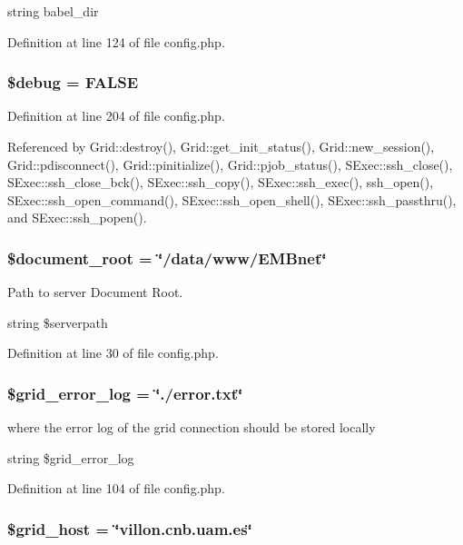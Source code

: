string babel\_\-dir 

Definition at line 124 of file config.php.
\subsubsection{\setlength{\rightskip}{0pt plus 5cm}\$debug = FALSE}\label{config_8php_a21}




Definition at line 204 of file config.php.

Referenced by Grid::destroy(), Grid::get\_\-init\_\-status(), Grid::new\_\-session(), Grid::pdisconnect(), Grid::pinitialize(), Grid::pjob\_\-status(), SExec::ssh\_\-close(), SExec::ssh\_\-close\_\-bck(), SExec::ssh\_\-copy(), SExec::ssh\_\-exec(), ssh\_\-open(), SExec::ssh\_\-open\_\-command(), SExec::ssh\_\-open\_\-shell(), SExec::ssh\_\-passthru(), and SExec::ssh\_\-popen().
\subsubsection{\setlength{\rightskip}{0pt plus 5cm}\$document\_\-root = \char`\"{}/data/www/EMBnet\char`\"{}}\label{config_8php_a2}


Path to server Document Root. 

string \$serverpath 

Definition at line 30 of file config.php.
\subsubsection{\setlength{\rightskip}{0pt plus 5cm}\$grid\_\-error\_\-log = \char`\"{}./error.txt\char`\"{}}\label{config_8php_a7}


where the error log of the grid connection should be stored locally 

string \$grid\_\-error\_\-log 

Definition at line 104 of file config.php.
\subsubsection{\setlength{\rightskip}{0pt plus 5cm}\$grid\_\-host = \char`\"{}villon.cnb.uam.es\char`\"{}}\label{config_8php_a16}


